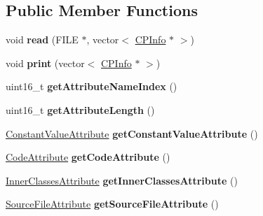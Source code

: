 \subsection*{Public Member Functions}
\begin{DoxyCompactItemize}
\item 
void {\bfseries read} (F\+I\+LE $\ast$, vector$<$ \hyperlink{classCPInfo}{C\+P\+Info} $\ast$ $>$)\hypertarget{classAttributeInfo_a3413daa38334773b032fb1b5298f9acc}{}\label{classAttributeInfo_a3413daa38334773b032fb1b5298f9acc}

\item 
void {\bfseries print} (vector$<$ \hyperlink{classCPInfo}{C\+P\+Info} $\ast$ $>$)\hypertarget{classAttributeInfo_a26dfac9d4fedf0aff08f76240f0e0180}{}\label{classAttributeInfo_a26dfac9d4fedf0aff08f76240f0e0180}

\item 
uint16\+\_\+t {\bfseries get\+Attribute\+Name\+Index} ()\hypertarget{classAttributeInfo_a9392cd3c3328782129745e842bba41b2}{}\label{classAttributeInfo_a9392cd3c3328782129745e842bba41b2}

\item 
uint16\+\_\+t {\bfseries get\+Attribute\+Length} ()\hypertarget{classAttributeInfo_a83e305b84d94ddaa200e905fcc6ca930}{}\label{classAttributeInfo_a83e305b84d94ddaa200e905fcc6ca930}

\item 
\hyperlink{classConstantValueAttribute}{Constant\+Value\+Attribute} {\bfseries get\+Constant\+Value\+Attribute} ()\hypertarget{classAttributeInfo_a405c8c2996e138315965ea4e20f83b84}{}\label{classAttributeInfo_a405c8c2996e138315965ea4e20f83b84}

\item 
\hyperlink{classCodeAttribute}{Code\+Attribute} {\bfseries get\+Code\+Attribute} ()\hypertarget{classAttributeInfo_a5c3822d70b765e9f0785c4ec7e0c7853}{}\label{classAttributeInfo_a5c3822d70b765e9f0785c4ec7e0c7853}

\item 
\hyperlink{classInnerClassesAttribute}{Inner\+Classes\+Attribute} {\bfseries get\+Inner\+Classes\+Attribute} ()\hypertarget{classAttributeInfo_ab0bb0de40d838b4bb52a5da708d0f6a6}{}\label{classAttributeInfo_ab0bb0de40d838b4bb52a5da708d0f6a6}

\item 
\hyperlink{classSourceFileAttribute}{Source\+File\+Attribute} {\bfseries get\+Source\+File\+Attribute} ()\hypertarget{classAttributeInfo_a09cdb336a64159e0f93ffe73b064e01c}{}\label{classAttributeInfo_a09cdb336a64159e0f93ffe73b064e01c}


\end{DoxyCompactItemize}
